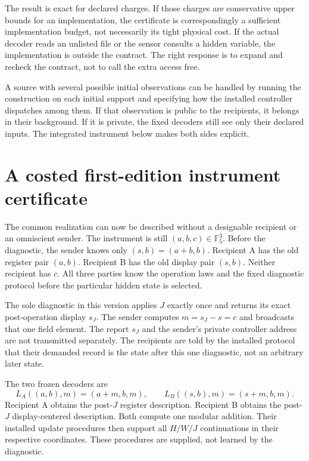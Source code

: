 \documentclass[11pt,letterpaper]{article}
\theoremstyle{plain}
\theoremstyle{definition}
\begin{document}
The result is exact for declared charges. If those charges are conservative upper bounds for an implementation, the certificate is correspondingly a sufficient implementation budget, not necessarily its tight physical cost. If the actual decoder reads an unlisted file or the sensor consults a hidden variable, the implementation is outside the contract. The right response is to expand and recheck the contract, not to call the extra access free.

A source with several possible initial observations can be handled by running the construction on each initial support and specifying how the installed controller dispatches among them. If that observation is public to the recipients, it belongs in their background. If it is private, the fixed decoders still see only their declared inputs. The integrated instrument below makes both sides explicit.

\section{A costed first-edition instrument certificate}\label{sec:first-ledger}
The common realization can now be described without a designable recipient or an omniscient sender. The instrument is still $(a,b,c)\in\mathbb F_5^3$. Before the diagnostic, the sender knows only $(s,b)=(a+b,b)$. Recipient A has the old register pair $(a,b)$. Recipient B has the old display pair $(s,b)$. Neither recipient has $c$. All three parties know the operation laws and the fixed diagnostic protocol before the particular hidden state is selected.

The sole diagnostic in this version applies $J$ exactly once and returns its exact post-operation display $s_J$. The sender computes $m=s_J-s=c$ and broadcasts that one field element. The report $s_J$ and the sender's private controller address are not transmitted separately. The recipients are told by the installed protocol that their demanded record is the state after this one diagnostic, not an arbitrary later state.

The two frozen decoders are
\begin{equation}\label{eq:fixed-instrument-decoders}
L_A((a,b),m)=(a+m,b,m),\qquad
L_B((s,b),m)=(s+m,b,m).
\end{equation}
Recipient A obtains the post-$J$ register description. Recipient B obtains the post-$J$ display-centered description. Both compute one modular addition. Their installed update procedures then support all $H/W/J$ continuations in their respective coordinates. These procedures are supplied, not learned by the diagnostic.
\end{document}
